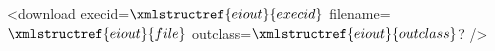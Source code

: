 <download execid=$\xmlstructref{eiout}{execid}$ filename=$\xmlstructref{eiout}{file}$ outclass=$\xmlstructref{eiout}{outclass}$? />


